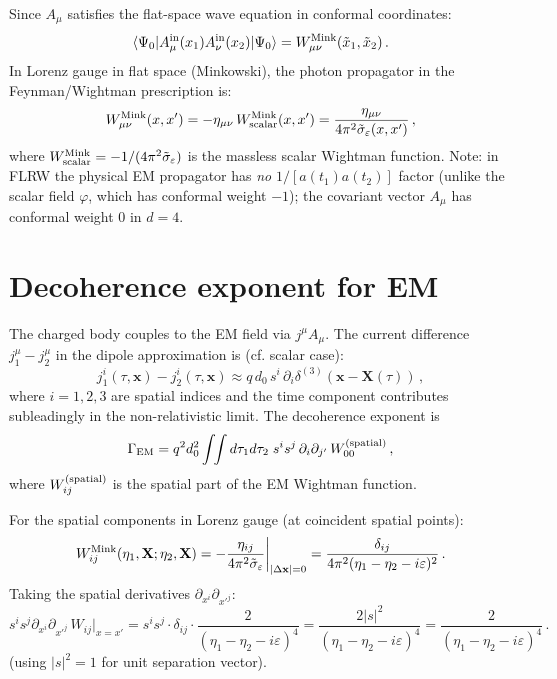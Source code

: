 \documentclass[12pt]{article}
\newcommand{\Scfac}{a}
\newcommand{\pd}{\partial}
\begin{document}
Since $A_{\mu}$ satisfies the flat-space wave equation in conformal coordinates:
%
\begin{equation}
  \langle\Psi_{0}|A_{\mu}^{\rm in}(x_{1})A_{\nu}^{\rm in}(x_{2})|\Psi_{0}\rangle
  =
  W_{\mu\nu}^{\rm Mink}(\tilde{x}_{1},\tilde{x}_{2}) \,.
\end{equation}
%
In Lorenz gauge in flat space (Minkowski), the photon propagator in the Feynman/Wightman
prescription is:
%
\begin{equation}
  W_{\mu\nu}^{\rm Mink}(x,x')
  =
  -\eta_{\mu\nu}\,W_{\rm scalar}^{\rm Mink}(x,x')
  =
  \frac{\eta_{\mu\nu}}{4\pi^{2}\tilde{\sigma}_{\varepsilon}(x,x')} \,,
  \label{eq:W-EM-Mink}
\end{equation}
%
where $W_{\rm scalar}^{\rm Mink} = -1/(4\pi^{2}\tilde\sigma_\varepsilon)$ is the massless
scalar Wightman function.  Note: in FLRW the physical EM propagator has \emph{no}
$1/[\Scfac(t_{1})\Scfac(t_{2})]$ factor (unlike the scalar field $\varphi$, which has
conformal weight $-1$); the covariant vector $A_\mu$ has conformal weight 0 in $d=4$.

\section*{Decoherence exponent for EM}

The charged body couples to the EM field via $j^{\mu}A_{\mu}$.  The current difference
$j_{1}^{\mu}-j_{2}^{\mu}$ in the dipole approximation is (cf. scalar case):
%
\begin{equation}
  j_{1}^{i}(\tau,\mathbf{x}) - j_{2}^{i}(\tau,\mathbf{x})
  \approx
  q\,d_{0}\,s^{i}\,\pd_{i}\delta^{(3)}(\mathbf{x}-\mathbf{X}(\tau)) \,,
\end{equation}
%
where $i=1,2,3$ are spatial indices and the time component contributes subleadingly
in the non-relativistic limit.  The decoherence exponent is
%
\begin{equation}
  \Gamma_{\rm EM}
  =
  q^{2}d_{0}^{2}
  \int\!\!\int d\tau_{1}d\tau_{2}\;
  s^{i}s^{j}\,\pd_{i}\pd_{j'}\,
  W_{00}^{(\rm spatial)} \,,
\end{equation}
%
where $W_{ij}^{(\rm spatial)}$ is the spatial part of the EM Wightman function.

For the spatial components in Lorenz gauge (at coincident spatial points):
%
\begin{equation}
  W_{ij}^{\rm Mink}(\eta_{1},\mathbf{X};\eta_{2},\mathbf{X})
  =
  -\frac{\eta_{ij}}{4\pi^{2}\tilde\sigma_\varepsilon}\bigg|_{|\Delta\mathbf{x}|=0}
  =
  \frac{\delta_{ij}}{4\pi^{2}(\eta_{1}-\eta_{2}-i\varepsilon)^{2}} \,.
\end{equation}
%
Taking the spatial derivatives $\pd_{x^i}\pd_{x'^j}$:
%
\begin{equation}
  s^{i}s^{j}\pd_{x^i}\pd_{x'^j}\,W_{ij}\big|_{x=x'}
  =
  s^{i}s^{j}\cdot\delta_{ij}\cdot\frac{2}{(\eta_1-\eta_2-i\varepsilon)^4}
  = \frac{2|s|^{2}}{(\eta_1-\eta_2-i\varepsilon)^{4}}
  = \frac{2}{(\eta_1-\eta_2-i\varepsilon)^{4}} \,.
\end{equation}
%
(using $|s|^{2}=1$ for unit separation vector).
\end{document}
